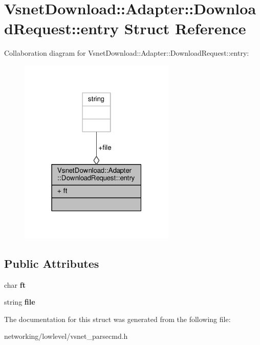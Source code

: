\hypertarget{structVsnetDownload_1_1Adapter_1_1DownloadRequest_1_1entry}{}\section{Vsnet\+Download\+:\+:Adapter\+:\+:Download\+Request\+:\+:entry Struct Reference}
\label{structVsnetDownload_1_1Adapter_1_1DownloadRequest_1_1entry}


Collaboration diagram for Vsnet\+Download\+:\+:Adapter\+:\+:Download\+Request\+:\+:entry\+:
\nopagebreak
\begin{figure}[H]
\begin{center}
\leavevmode
\includegraphics[width=211pt]{dc/d71/structVsnetDownload_1_1Adapter_1_1DownloadRequest_1_1entry__coll__graph}
\end{center}
\end{figure}
\subsection*{Public Attributes}
\begin{DoxyCompactItemize}
\item 
char {\bfseries ft}\hypertarget{structVsnetDownload_1_1Adapter_1_1DownloadRequest_1_1entry_a585c0e311b9ff6b546eb33401c8f5435}{}\label{structVsnetDownload_1_1Adapter_1_1DownloadRequest_1_1entry_a585c0e311b9ff6b546eb33401c8f5435}

\item 
string {\bfseries file}\hypertarget{structVsnetDownload_1_1Adapter_1_1DownloadRequest_1_1entry_a942782a3ca7cbe8df1ac647ad3e5c3bf}{}\label{structVsnetDownload_1_1Adapter_1_1DownloadRequest_1_1entry_a942782a3ca7cbe8df1ac647ad3e5c3bf}

\end{DoxyCompactItemize}


The documentation for this struct was generated from the following file\+:\begin{DoxyCompactItemize}
\item 
networking/lowlevel/vsnet\+\_\+parsecmd.\+h\end{DoxyCompactItemize}
